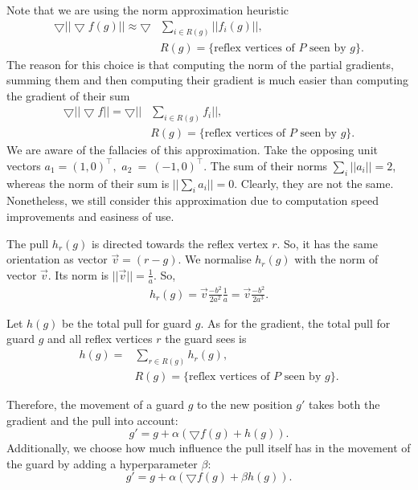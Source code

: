 Note that we are using the norm approximation heuristic 
\begin{align*}
    \bigtriangledown ||\bigtriangledown f(g)|| \approx \bigtriangledown &\sum_{i \in R(g)} ||f_i(g)||, \\
    &R(g) = \{\text{reflex vertices of } P \text{ seen by } g\}. 
\end{align*}
The reason for this choice is that computing the norm of the partial gradients, summing them and then computing their gradient is much easier than computing the gradient of their sum 
\begin{align*}
    \bigtriangledown ||\bigtriangledown f|| = \bigtriangledown ||&\sum_{i \in R(g)} f_i||, \\
    &R(g) = \{\text{reflex vertices of } P \text{ seen by } g\}.
\end{align*}
We are aware of the fallacies of this approximation. Take the opposing unit vectors $a_1 = (1, 0)^\intercal,$ $a_2~=~(-1, 0)^\intercal$. The sum of their norms $\sum_i ||a_i|| = 2$, whereas the norm of their sum is $||\sum_i a_i|| = 0$. Clearly, they are not the same. Nonetheless, we still consider this approximation due to computation speed improvements and easiness of use.

The pull $h_r(g)$ is directed towards the reflex vertex $r$. So, it has the same orientation as vector $\vec{v} = (r - g)$. We  normalise $h_r(g)$ with the norm of vector $\vec{v}$. Its norm is $||\vec{v}|| = \frac 1 a$. So, 
\begin{align}
    h_r(g) = \vec{v}\frac{-b^2}{2a^2}\frac 1 a = \vec{v}\frac{-b^2}{2a^3}. \label{eq:h}
\end{align}

Let $h(g)$ be the total pull for guard $g$. As for the gradient, the total pull for guard $g$ and all reflex vertices $r$ the guard sees is 
\begin{align*}
    h(g) = &\sum_{r \in R(g)} h_r(g), \\
    &R(g) = \{\text{reflex vertices of $P$ seen by $g$\}}.
\end{align*}

Therefore, the movement of a guard $g$ to the new position $g'$ takes both the gradient and the pull into account: $$g' = g + \alpha (\bigtriangledown f(g) + h(g)).$$ Additionally, we  choose how much influence the pull itself has in the movement of the guard by adding a hyperparameter $\beta$: $$g' = g + \alpha (\bigtriangledown f(g) + \beta h(g)).$$

